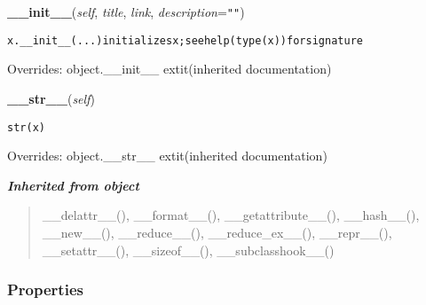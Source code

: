     \vspace{0.5ex}

\hspace{.8\funcindent}\begin{boxedminipage}{\funcwidth}

    \raggedright \textbf{\_\_init\_\_}(\textit{self}, \textit{title}, \textit{link}, \textit{description}={\tt ""})

\setlength{\parskip}{2ex}
\begin{alltt}
x.\_\_init\_\_(...) initializes x; see help(type(x)) for signature
\end{alltt}

\setlength{\parskip}{1ex}
      Overrides: object.\_\_init\_\_ 	extit{(inherited documentation)}

    \end{boxedminipage}

    \vspace{0.5ex}

\hspace{.8\funcindent}\begin{boxedminipage}{\funcwidth}

    \raggedright \textbf{\_\_str\_\_}(\textit{self})

\setlength{\parskip}{2ex}
\begin{alltt}
str(x)
\end{alltt}

\setlength{\parskip}{1ex}
      Overrides: object.\_\_str\_\_ 	extit{(inherited documentation)}

    \end{boxedminipage}


\large{\textbf{\textit{Inherited from object}}}

\begin{quote}
\_\_delattr\_\_(), \_\_format\_\_(), \_\_getattribute\_\_(), \_\_hash\_\_(), \_\_new\_\_(), \_\_reduce\_\_(), \_\_reduce\_ex\_\_(), \_\_repr\_\_(), \_\_setattr\_\_(), \_\_sizeof\_\_(), \_\_subclasshook\_\_()
\end{quote}


  \subsubsection{Properties}

